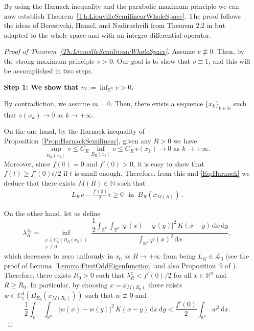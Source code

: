 \documentclass[12pt,reqno]{amsart}
\theoremstyle{definition}
\theoremstyle{remark}
\newcommand{\con}[1]{\mathbb{#1}}
\newcommand{\R}{\con{R}} %
\newcommand{\N}{\con{N}} %
\renewcommand{\d}{\,\mathrm{d}} %
\def\ds{\displaystyle}
\numberwithin{equation}{section}
\begin{document}
By using the Harnack inequality and the parabolic maximum principle we can now establish Theorem~\ref{Th:LiouvilleSemilinearWholeSpace}. The proof follows the ideas of Berestycki, Hamel, and Nadirashvili from Theorem 2.2 in \cite{BerestyckiHamelNadi} but adapted to the whole space and with an integro-differential operator.

\begin{proof}[Proof of Theorem~\ref{Th:LiouvilleSemilinearWholeSpace}]
	
	
	Assume $v\not\equiv 0$. Then, by the strong maximum principle $v>0$. Our goal is to show that $v\equiv 1$, and this will be accomplished in two steps.
	
	\textbf{Step 1: We show that $m:=\inf_{\R^n} v >0$.} 
	
	By contradiction, we assume $m=0$. Then, there exists a sequence $\{x_k\}_{k\in\N}$ such that $v(x_k)\rightarrow 0$ as $k \rightarrow +\infty$.
	
	On the one hand, by the Harnack inequality of Proposition~\ref{Prop:HarnackSemilinear}, given any $R>0$ we have 
	\begin{equation}
	\label{Eq:Harnack}
	\sup_{B_R(x_k)}v \leq C_R \inf_{B_R(x_k)}v \leq C_R \, v(x_k) \rightarrow 0 \,\,\text{as}\,\, k\rightarrow +\infty.
	\end{equation}
	Moreover, since $f(0) = 0 $ and $f'(0)>0$, it is easy to show that $f(t)\geq f'(0)t/2$ if $t$ is small enough. Therefore, from this and \eqref{Eq:Harnack}  we deduce that there exists $M(R)\in\N$ such that
	\begin{align}
	\label{Eq:WholeSpace2}
	L_K  v - \frac{f'(0)}{2}v \geq 0 \,\,\textrm{ in }\ B_R(x_{M(R)})\,.
	\end{align}
	
	
	On the other hand, let us define
	$$  \lambda_R^{x_0} = \inf_{\substack{\varphi\in C^1_c(B_R(x_0))\\ \varphi\not\equiv 0}} \frac{\ds  \dfrac{1}{2}\int_{\R^n}\int_{\R^n}|\varphi(x)-\varphi(y)|^2\,K(x-y) \d x \d y}{\ds \int_{\R^n}\varphi(x)^2 \d x}, 
	$$
	which decreases to zero uniformly in $x_0$ as $R\to +\infty$ from being $L_K \in\mathcal{L}_0$ (see the proof of Lemma~\ref{Lemma:FirstOddEigenfunction} and also Proposition~9 of \cite{ServadeiValdinoci}). Therefore, there exists $R_0>0$ such that $ \lambda_R^x < f'(0)/2$ for all $x\in \R^n$ and $R\geq R_0$. In particular, by choosing $x=x_{M(R_0)}$ there exists $w\in C^1_c(B_{R_0}(x_{M(R_0)}))$ such that $w\not\equiv 0$ and
	\begin{equation}
	\label{Eq:Eigenfunction}
	\dfrac{1}{2}\int_{\R^n}\int_{\R^n}|w(x)-w(y)|^2\,K(x-y) \d x \d y < \frac{f'(0)}{2}\int_{\R^n}w^2 \d x.
	\end{equation}
	

\end{proof}
\end{document}
